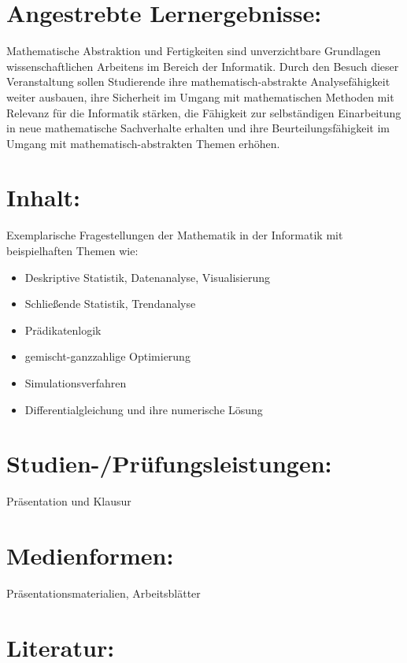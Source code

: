 \section*{Angestrebte
Lernergebnisse:}\label{angestrebte-lernergebnisse-2}

Mathematische Abstraktion und Fertigkeiten sind unverzichtbare
Grundlagen wissenschaftlichen Arbeitens im Bereich der Informatik. Durch
den Besuch dieser Veranstaltung sollen Studierende ihre
mathematisch-abstrakte Analysefähigkeit weiter ausbauen, ihre Sicherheit
im Umgang mit mathematischen Methoden mit Relevanz für die Informatik
stärken, die Fähigkeit zur selbständigen Einarbeitung in neue
mathematische Sachverhalte erhalten und ihre Beurteilungsfähigkeit im
Umgang mit mathematisch-abstrakten Themen erhöhen.

\section*{Inhalt:}\label{inhalt-2}

Exemplarische Fragestellungen der Mathematik in der Informatik mit
beispielhaften Themen wie:

\begin{itemize}
\item
  Deskriptive Statistik, Datenanalyse, Visualisierung
\item
  Schließende Statistik, Trendanalyse
\item
  Prädikatenlogik
\item
  gemischt-ganzzahlige Optimierung
\item
  Simulationsverfahren
\item
  Differentialgleichung und ihre numerische Lösung
\end{itemize}

\section*{Studien-/Prüfungsleistungen:}\label{studien-pruxfcfungsleistungen-2}

Präsentation und Klausur

\section*{Medienformen:}\label{medienformen-2}

Präsentationsmaterialien, Arbeitsblätter

\section*{Literatur:}\label{literatur-2}

